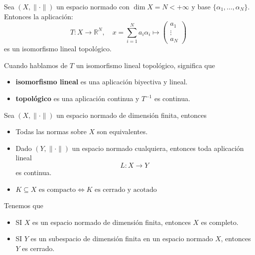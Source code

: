 \documentclass[12pt]{book}
\newcommand{\tbf}{\textbf}
\begin{document}
\begin{prop}
    Sea $(X, \|\cdot\|)$ un espacio normado con $\dim X = N < +\infty$ y base $\{\alpha_1, \dots, \alpha_N\}$. Entonces la aplicación:
    \begin{equation*}
        T : X \longrightarrow \mathbb{R}^N, \quad x = \sum_{i=1}^N a_i \alpha_i \mapsto 
        \begin{pmatrix} 
            a_1 \\ 
            \vdots \\ 
            a_N 
        \end{pmatrix}
    \end{equation*}
    es un isomorfismo lineal topológico.
\end{prop}

\begin{observacion}
    Cuando hablamos de $T$ un isomorfismo lineal topológico, significa que 
    \begin{itemize}
        \item \tbf{isomorfismo lineal} es una aplicación biyectiva y lineal.
        \item \tbf{topológico} es una aplicación continua y $T^{-1}$ es continua. \\
    \end{itemize}
\end{observacion}

\begin{coro}
    Sea $(X, \|\cdot\|)$ un espacio normado de dimensión finita, entonces
    \begin{itemize}
        \item Todas las normas sobre $X$ son equivalentes.
        \item Dado $(Y, \|\cdot\|)$ un espacio normado cualquiera, entonces toda aplicación lineal
            \begin{equation*}
                L: X \longrightarrow Y
            \end{equation*}
            es continua.
        \item $K\subseteq X \text{ es compacto} \iff K \text{ es cerrado y acotado}$
    \end{itemize}
\end{coro}

\begin{prop}
    Tenemos que
    \begin{itemize}
        \item SI $X$ es un espacio normado de dimensión finita, entonces $X$ es completo.
        \item SI $Y$ es un subespacio de dimensión finita en un espacio normado $X$, entonces $Y$ es cerrado.
    \end{itemize}
\end{prop}
\end{document}
